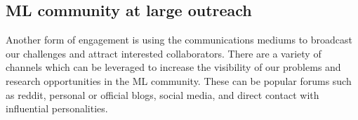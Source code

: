 



\subsection{ML community at large outreach}
Another form of engagement is using the communications mediums to broadcast our challenges and attract interested collaborators. There are a variety of channels which can be leveraged to increase the visibility of our problems and research opportunities in the ML community. These can be popular forums such as reddit, personal or official blogs, social media, and direct contact with influential personalities.

